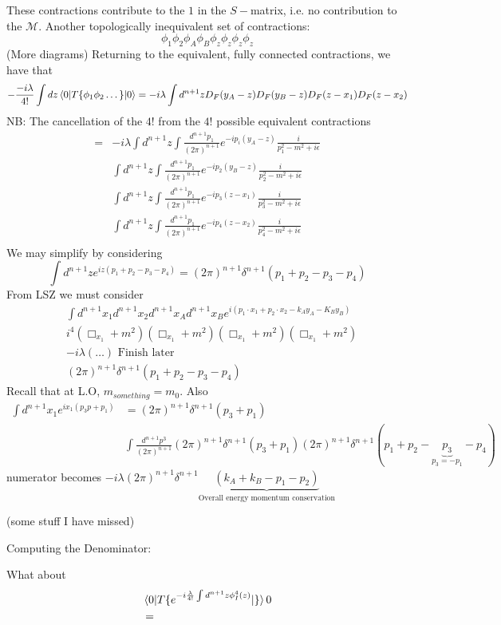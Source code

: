 These contractions contribute to the $1$ in the $S-$matrix, i.e. no contribution to the $\mathcal{M}$. Another topologically inequivalent set of contractions: 
$$\phi_1  \phi_2 \phi_A \phi_B \phi_z \phi_z \phi_z \phi_z$$
(More diagrams)
Returning to the equivalent, fully connected contractions, we have that $$-\frac{-i\lambda}{4!}  \int dz \mel{0}{T\{ \phi_1 \phi_2 \dots   \}}{0} = -i\lambda \int d^{n+1} 
z D_F(y_A - z) D_F(y_B - z) D_F(z - x_1) D_F(z - x_2) $$
NB: The cancellation of the $4!$ from the $4!$ possible equivalent contractions
\begin{align}
    = &  -i\lambda \int d^{n+1} z \int \frac{d^{n+1} p_1 }{(2\pi)^{n+1}} e^{-ip_i (y_A-z)} \frac{i}{p_{1}^2 - m^2 + i\epsilon } \nonumber\\
   &  \int d^{n+1} z \int \frac{d^{n+1} p_1 }{(2\pi)^{n+1}} e^{-ip_2 (y_B-z)} \frac{i}{p_{2}^2 - m^2 + i\epsilon} \nonumber\\
    & \int d^{n+1} z \int \frac{d^{n+1} p_1 }{(2\pi)^{n+1}} e^{-ip_3 (z-x_1)} \frac{i}{p_{3}^2 - m^2 + i\epsilon } \nonumber\\
    & \int d^{n+1} z \int \frac{d^{n+1} p_1 }{(2\pi)^{n+1}} e^{-ip_4 (z-x_2)} \frac{i}{p_{4}^2 - m^2 + i\epsilon } \nonumber\\
\end{align}
We may simplify by considering 
$$\int d^{n+1}  z e^{iz  (p_1 + p_2 - p_3 - p_4)} = (2\pi)^{n+1}  \delta^{n+1} (p_1 + p_2 - p_3- p_4) $$
From LSZ we must consider 
\begin{align}
   &  \int d^{n+1} x_1 d^{n+1} x_2 d^{n+1} x_A d^{n+1} x_B e^{i (p_1 \cdot x_1 + p_2 \cdot x_2    - k_A y_A - K_B y_B  )} \nonumber\\
   & i^4 \left( \Box_{x_1} + m^2  \right)\left( \Box_{x_1} + m^2  \right)\left( \Box_{x_1} + m^2  \right)\left( \Box_{x_1} + m^2  \right) \nonumber\\
   & -i\lambda (\dots ) \text{ Finish later} \nonumber\\
   & (2\pi)^{n+1} \delta^{n+1} (p_1 +p_2 - p_3 - p_4)
\end{align}
 Recall that at L.O, $m_{something} = m_0$. Also 
 \begin{align}
     \int d^{n+1} x_1 e^{ix_1  (p_3 p+ p_1)} & = (2\pi)^{n+1} \delta^{n+1} (p_3 + p_1) \nonumber \\
     & \int \frac{d^{n+1} p^3 }{(2\pi)^{n+1}} (2\pi)^{n+1} \delta^{n+1} (p_3 + p_1) (2\pi)^{n+1} \delta^{n+1} (p_1 + p_2 - \underbrace{p_3}_\text{$p_3 = -p_1$} - p_4)
 \end{align}
numerator becomes 
$-i\lambda  (2\pi)^{n+1} \delta^{n+1} \underbrace{(k_A + k_B - p_1 - p_2)}_\text{Overall energy momentum conservation}$


(some stuff I have missed)


Computing the Denominator:

What about 
\begin{align}
   & \mel{0}{T\{ e^{-i \frac{\lambda}{4!} 
 \int d^{n+1}  z \phi_{I}^{4} (z) }}  \}{0} \nonumber\\
 & =
\end{align}





